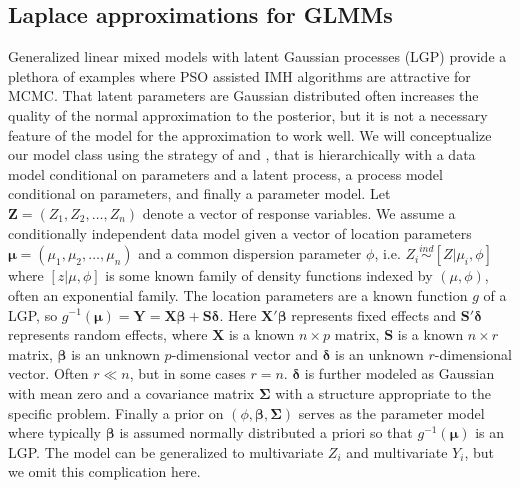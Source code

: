 \documentclass[12pt]{article}
\begin{document}
\subsection{Laplace approximations for GLMMs}\label{subsec:glm}
Generalized linear mixed models with latent Gaussian processes (LGP) provide a plethora of examples where PSO assisted IMH algorithms are attractive for MCMC. That latent parameters are Gaussian distributed often increases the quality of the normal approximation to the posterior, but it is not a necessary feature of the model for the approximation to work well. We will conceptualize our model class using the strategy of \citet{berliner1996hierarchical} and \citet{wikle2003hierarchical}, that is hierarchically with a data model conditional on parameters and a latent process, a process model conditional on parameters, and finally a parameter model. Let $\bm{Z}=(Z_1,Z_2,\dots,Z_n)$ denote a vector of response variables. We assume a conditionally independent data model given a vector of location parameters $\bm{\mu} = (\mu_1, \mu_2, \dots, \mu_n)$ and a common dispersion parameter $\phi$, i.e. $Z_i \stackrel{ind}{\sim} [Z|\mu_i,\phi]$ where $[z|\mu,\phi]$ is some known family of density functions indexed by $(\mu, \phi)$, often an exponential family. The location parameters are a known function $g$ of a LGP, so $g^{-1}(\bm{\mu}) = \bm{Y} = \bm{X}\bm{\beta} + \bm{S}\bm{\delta}$. Here $\bm{X}'\bm{\beta}$ represents fixed effects and $\bm{S}'\bm{\delta}$ represents random effects, where $\bm{X}$ is a known $n\times p$ matrix, $\bm{S}$ is a known $n\times r$ matrix, $\bm{\beta}$ is an unknown $p$-dimensional vector and $\bm{\delta}$ is an unknown $r$-dimensional vector. Often $r\ll n$, but in some cases $r=n$. $\bm{\delta}$ is further modeled as Gaussian with mean zero and a covariance matrix $\bm{\Sigma}$ with a structure appropriate to the specific problem. Finally a prior on $(\phi, \bm{\beta}, \bm{\Sigma})$ serves as the parameter model where typically $\bm{\beta}$ is assumed normally distributed a priori so that $g^{-1}(\bm{\mu})$ is an LGP. The model can be generalized to multivariate $Z_i$ and multivariate $Y_i$, but we omit this complication here. 
\end{document}
